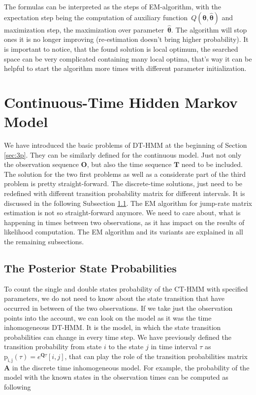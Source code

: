 \documentclass[thesis=M,english]{FITthesis}[2012/10/20]
\newcommand{\matr}[1]{\mathbf{#1}}
\begin{document}
The formulas can be interpreted as the steps of EM-algorithm, with the expectation step being the computation of auxiliary function~$Q(\matr{\theta},\hat{\matr{\theta}})$ and maximization step, the maximization over parameter~$\hat{\matr{\theta}}$. The algorithm will stop ones it is no longer improving (re-estimation doesn't bring higher probability). It is important to notice, that the found solution is local optimum, the searched space can be very complicated containing many local optima, that's way it can be helpful to start the algorithm more times with different parameter initialization.  


\section{Continuous-Time Hidden Markov Model}

We have introduced the basic problems of DT-HMM at the beginning of Section \ref{sec:3p}. They can be similarly defined for the continuous model. Just not only the observation sequence $\matr{O}$, but also the time sequence $\matr{T}$ need to be included. The solution for the two first problems as well as a considerate part of the third problem is pretty straight-forward. The discrete-time solutions, just need to be redefined with different transition probability matrix for different intervals. It is discussed in the following Subsection \ref{sec:pos}. The EM algorithm for jump-rate matrix estimation is not so straight-forward anymore. We need to care about, what is happening in times between two observations, as it has impact on the results of likelihood computation. The EM algorithm and its variants are explained in all the remaining subsections.   


\subsection{The Posterior State Probabilities}\label{sec:pos}

To count the single and double states probability of the CT-HMM with specified parameters, we do not need to know about the state transition that have occurred in between of the two observations.
If we take just the observation points into the account, we can look on the model as it was the time inhomogeneous DT-HMM. It is the model, in which the state transition probabilities can change in every time step. We have previously defined the transition probability from state $i$ to the state $j$ in time interval $\tau$ as $\mathrm{p_{i,j}}( \tau ) = e^{ \matr{Q} \tau}[i,j]$, that can play the role of the transition probabilities matrix $\matr{A}$ in the discrete time inhomogeneous model. For example, the probability of the model with the known states in the observation times can be computed as following
\end{document}
